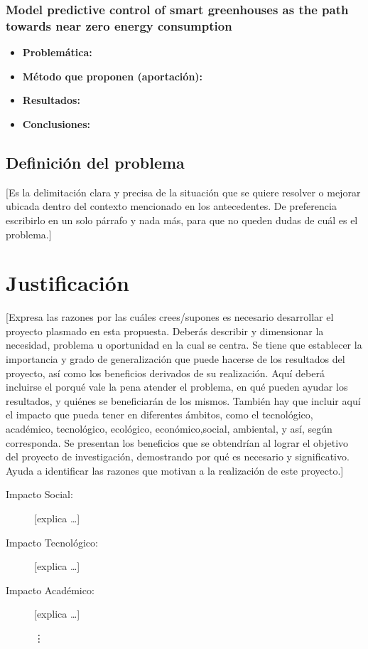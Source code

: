 \documentclass[final,12pt]{article}
\begin{document}
\subsubsection{Model predictive control of smart greenhouses as the path towards near zero energy consumption}
\begin{itemize}
    \item \textbf{Problemática: }
    \item \textbf{Método que proponen (aportación): }
    \item \textbf{Resultados: }
    \item \textbf{Conclusiones:}
\end{itemize}



\subsection{Definición del problema}

[Es la delimitación clara y precisa de la situación que se quiere resolver o mejorar ubicada dentro del contexto mencionado en los antecedentes.
De preferencia escribirlo en un solo párrafo y nada más, para que no queden dudas de cuál es el problema.]


\section{Justificación}

[Expresa las razones por las cuáles crees/supones es necesario desarrollar el proyecto plasmado en esta propuesta. 
Deberás describir y dimensionar la necesidad, problema u oportunidad en la cual se centra. 
Se tiene que establecer la importancia y grado de generalización que puede hacerse de los resultados del proyecto, así como los beneficios derivados de su realización. 
Aquí deberá incluirse el porqué vale la pena atender el problema, en qué pueden ayudar los resultados, y quiénes se beneficiarán de los mismos. También hay que incluir aquí el impacto que pueda tener en diferentes ámbitos, como el  tecnológico, académico, tecnológico, ecológico, económico,social, ambiental, y así, según corresponda. 
Se presentan los beneficios que se obtendrían al lograr el objetivo del proyecto de investigación, demostrando por qué es necesario y significativo. 
Ayuda a identificar las razones que motivan a la realización de este proyecto.]
\begin{description}
\item [Impacto Social:] [explica
\dots]


\item [Impacto Tecnológico:]
[explica
\dots]

\item [Impacto Académico:] 
[explica \dots]

\vdots


\end{description}
\end{document}
